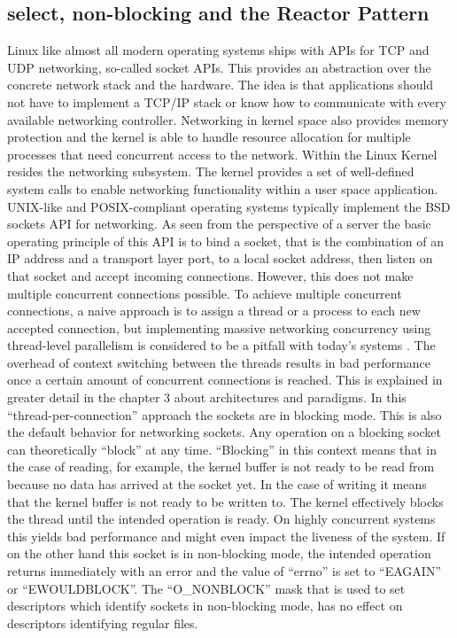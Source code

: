 \subsection{select, non-blocking and the Reactor Pattern}
Linux like almost all modern operating systems ships with APIs for TCP and UDP networking, so-called socket APIs. This provides an abstraction over the concrete network stack and the hardware. The idea is that applications should not have to implement a TCP/IP stack or know how to communicate with every available networking controller. Networking in kernel space also provides memory protection and the kernel is able to handle resource allocation for multiple processes that need concurrent access to the network. \newline
Within the Linux Kernel resides the networking subsystem. The kernel provides a set of well-defined system calls to enable networking functionality within a user space application.
UNIX-like and POSIX-compliant operating systems typically implement the BSD sockets API for networking. As seen from the perspective of a server the basic operating principle of this API is to bind a socket, that is the combination of an IP address and a transport layer port, to a local socket address, then listen on that socket and accept incoming connections. However, this does not make multiple concurrent connections possible. \newline
To achieve multiple concurrent connections, a naive approach is to assign a thread or a process to each new accepted connection, but implementing massive networking concurrency using thread-level parallelism is considered to be a pitfall with today’s systems \cite[1245]{kerrisk:linuxapi}\cite{kegel:c10k}. The overhead of context switching between the threads results in bad performance once a certain amount of concurrent connections is reached. This is explained in greater detail in the chapter 3 about architectures and paradigms. \newline
In this “thread-per-connection” approach the sockets are in blocking mode. This is also the default behavior for networking sockets. Any operation on a blocking socket can theoretically “block” at any time. “Blocking” in this context means that in the case of reading, for example, the kernel buffer is not ready to be read from because no data has arrived at the socket yet. In the case of writing it means that the kernel buffer is not ready to be written to. The kernel effectively blocks the thread until the intended operation is ready. On highly concurrent systems this yields bad performance and might even impact the liveness of the system. If on the other hand this socket is in non-blocking mode, the intended operation returns immediately with an error and the value of “errno” is set to “EAGAIN” or “EWOULDBLOCK”. The “O\_NONBLOCK” mask that is used to set descriptors which identify sockets in non-blocking mode, has no effect on descriptors identifying regular files.
